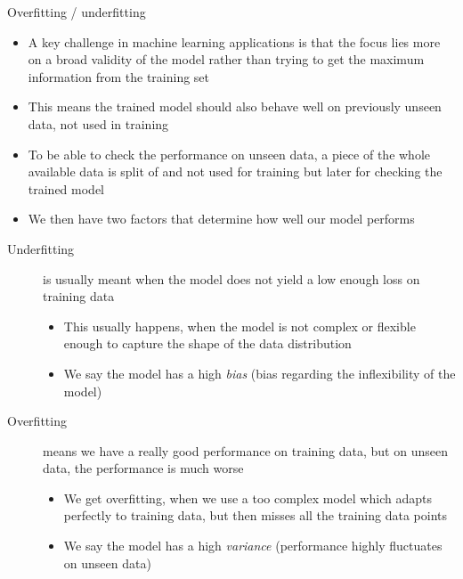     \begin{frame}{Overfitting / underfitting}
      \begin{itemize}
        \item A key challenge in machine learning applications is that the focus lies more on a broad validity of the model rather than trying to get the maximum information from the training set
        \item This means the trained model should also behave well on previously unseen data, not used in training
        \item To be able to check the performance on unseen data, a piece of the whole available data is split of and not used for training but later for checking the trained model
        \item We then have two factors that determine how well our model performs
      \end{itemize}
      \begin{description}
        \item[Underfitting] is usually meant when the model does not yield a low enough loss on training data
        \begin{itemize}
          \item This usually happens, when the model is not complex or flexible enough to capture the shape of the data distribution
          \item We say the model has a high \emph{bias} (bias regarding the   inflexibility of the model)
        \end{itemize}
        \item[Overfitting] means we have a really good performance on training data, but on unseen data, the performance is much worse
          \begin{itemize}
            \item We get overfitting, when we use a too complex model which adapts perfectly to training data, but then misses all the training data points
          \item We say the model has a high \emph{variance} (performance highly fluctuates on unseen data)
          \end{itemize}
      \end{description}
    \end{frame}

